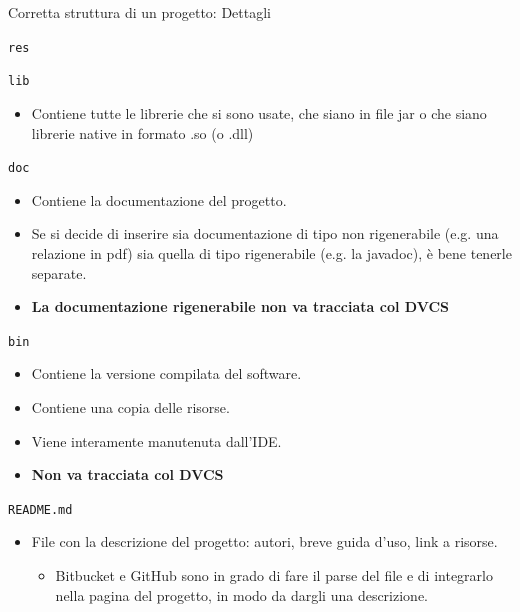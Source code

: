 \documentclass[presentation]{beamer}
\begin{document}
\begin{frame}[allowframebreaks]{Corretta struttura di un progetto: Dettagli}
\begin{block}{\texttt{res}}
\begin{itemize}
		\end{itemize}
	\end{block}
	\begin{block}{\texttt{lib}}
		\begin{itemize}
			\item	Contiene tutte le librerie che si sono usate, che siano in file jar o che siano librerie native in formato .so (o .dll)
		\end{itemize}
	\end{block}
	\begin{block}{\texttt{doc}}
		\begin{itemize}
			\item Contiene la documentazione del progetto.
			\item Se si decide di inserire sia documentazione di tipo non rigenerabile (e.g. una relazione in pdf) sia quella di tipo rigenerabile (e.g. la javadoc), è bene tenerle separate.
			\item \textbf{La documentazione rigenerabile non va tracciata col DVCS}
		\end{itemize}
	\end{block}
	\begin{block}{\texttt{bin}}
		\begin{itemize}
			\item Contiene la versione compilata del software.
			\item Contiene una copia delle risorse.
			\item Viene interamente manutenuta dall'IDE.
			\item \textbf{Non va tracciata col DVCS}
		\end{itemize}
	\end{block}
	\begin{block}{\texttt{README.md}}
		\begin{itemize}
			\item File con la descrizione del progetto: autori, breve guida d'uso, link a risorse.
			\begin{itemize}
				\item Bitbucket e GitHub sono in grado di fare il parse del file e di integrarlo nella pagina del progetto, in modo da dargli una descrizione.
			\end{itemize} 
		\end{itemize} 
	\end{block}
\end{frame}
\end{document}
